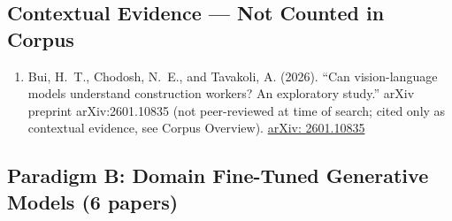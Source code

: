 \documentclass[11pt]{article}
\begin{document}
\subsection*{Contextual Evidence --- Not Counted in Corpus}

\begin{enumerate}[label=\textbf{X1.}]

\item Bui, H.~T., Chodosh, N.~E., and Tavakoli, A. (2026). ``Can vision-language models understand construction workers? An exploratory study.'' arXiv preprint arXiv:2601.10835 (not peer-reviewed at time of search; cited only as contextual evidence, see Corpus Overview). \href{https://arxiv.org/abs/2601.10835}{arXiv: 2601.10835}

\end{enumerate}

\subsection{Paradigm B: Domain Fine-Tuned Generative Models (6 papers)}
\end{document}
